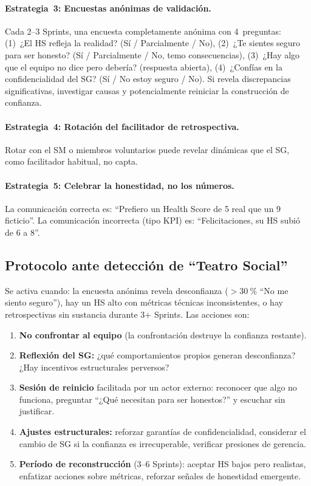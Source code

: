 \paragraph{Estrategia~3: Encuestas anónimas de validación.} Cada 2--3 Sprints, una encuesta completamente anónima con 4~preguntas: (1)~¿El HS refleja la realidad? (Sí / Parcialmente / No), (2)~¿Te sientes seguro para ser honesto? (Sí / Parcialmente / No, temo consecuencias), (3)~¿Hay algo que el equipo no dice pero debería? (respuesta abierta), (4)~¿Confías en la confidencialidad del SG? (Sí / No estoy seguro / No). Si revela discrepancias significativas, investigar causas y potencialmente reiniciar la construcción de confianza.

\paragraph{Estrategia~4: Rotación del facilitador de retrospectiva.} Rotar con el SM o miembros voluntarios puede revelar dinámicas que el SG, como facilitador habitual, no capta.

\paragraph{Estrategia~5: Celebrar la honestidad, no los números.} La comunicación correcta es: ``Prefiero un Health Score de 5 real que un 9 ficticio''. La comunicación incorrecta (tipo KPI) es: ``Felicitaciones, su HS subió de 6 a 8''.

\subsection{Protocolo ante detección de ``Teatro Social''}

Se activa cuando: la encuesta anónima revela desconfianza ($>30~\%$ ``No me siento seguro''), hay un HS alto con métricas técnicas inconsistentes, o hay retrospectivas sin sustancia durante 3+ Sprints. Las acciones son:

\begin{enumerate}[nosep]
    \item \textbf{No confrontar al equipo} (la confrontación destruye la confianza restante).
    \item \textbf{Reflexión del SG:} ¿qué comportamientos propios generan desconfianza? ¿Hay incentivos estructurales perversos?
    \item \textbf{Sesión de reinicio} facilitada por un actor externo: reconocer que algo no funciona, preguntar ``¿Qué necesitan para ser honestos?'' y escuchar sin justificar.
    \item \textbf{Ajustes estructurales:} reforzar garantías de confidencialidad, considerar el cambio de SG si la confianza es irrecuperable, verificar presiones de gerencia.
    \item \textbf{Período de reconstrucción} (3--6 Sprints): aceptar HS bajos pero realistas, enfatizar acciones sobre métricas, reforzar señales de honestidad emergente.
\end{enumerate}

